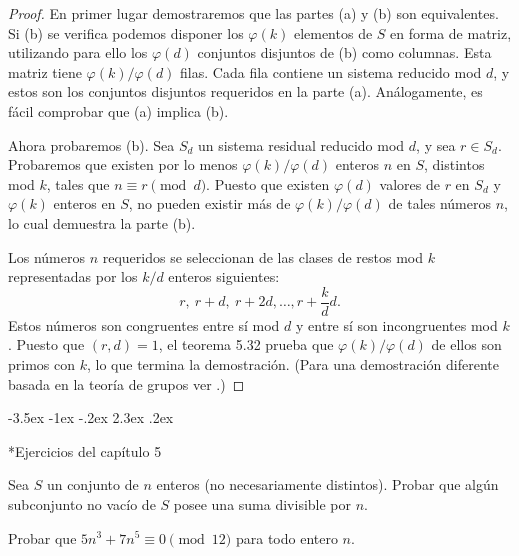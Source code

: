 \documentclass[12pt,a4paper]{book}
\makeatletter
\renewcommand\section{\@startsection{section}{1}{\z@}%
  {-3.5ex \@plus -1ex \@minus -.2ex}%
  {2.3ex \@plus .2ex}%
  {\normalfont\Large\bfseries\raggedright}}
\makeatother
\begin{document}
    \begin{proof}
        En primer lugar demostraremos que las partes (a) y (b) son equivalentes. Si (b) se
        verifica podemos disponer los $\varphi(k)$ elementos de $S$ en forma de matriz,
        utilizando para ello los $\varphi(d)$ conjuntos disjuntos de (b) como columnas.
        Esta matriz tiene $\varphi(k)/\varphi(d)$ filas. Cada fila contiene un sistema
        reducido mod $d$, y estos son los conjuntos disjuntos requeridos en la parte (a).
        Análogamente, es fácil comprobar que (a) implica (b).

        Ahora probaremos (b). Sea $S_{d}$ un sistema residual reducido mod $d$, y sea
        $r\in S_{d}$. Probaremos que existen por lo menos $\varphi(k)/\varphi(d)$ enteros
        $n$ en $S$, distintos mod $k$, tales que $n\equiv r\pmod{d}$. Puesto que existen
        $\varphi(d)$ valores de $r$ en $S_{d}$ y $\varphi(k)$ enteros en $S$, no pueden
        existir más de $\varphi(k)/\varphi(d)$ de tales números $n$, lo cual demuestra la
        parte (b).

        Los números $n$ requeridos se seleccionan de las clases de restos mod $k$
        representadas por los $k/d$ enteros siguientes:
        \begin{equation*}
            r,\ r+d,\ r+2d,\dots,r+\frac{k}{d}d.
        \end{equation*}
        Estos números son congruentes entre sí mod $d$ y entre sí son incongruentes mod
        $k$. Puesto que $(r,d)=1$, el teorema 5.32 prueba que $\varphi(k)/\varphi(d)$ de
        ellos son primos con $k$, lo que termina la demostración. (Para una demostración
        diferente basada en la teoría de grupos ver \cite{apostol1970}.)
    \end{proof}

    \section*{Ejercicios del capítulo 5}

    \begin{ejercicio}
        Sea $S$ un conjunto de $n$ enteros (no necesariamente distintos). Probar que algún
        subconjunto no vacío de $S$ posee una suma divisible por $n$.
    \end{ejercicio}

    \begin{ejercicio}
        Probar que $5n^{3}+7n^{5}\equiv0\pmod{12}$ para todo entero $n$.
    \end{ejercicio}
\end{document}
